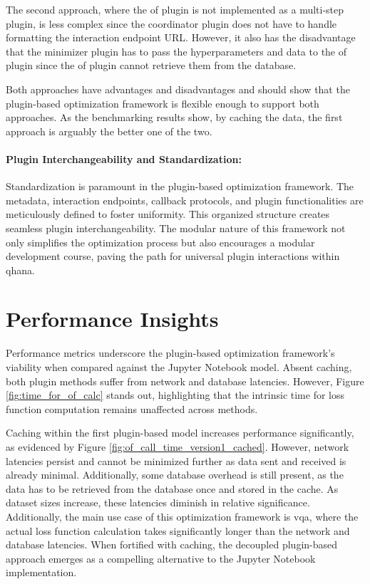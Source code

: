 \documentclass[
  a4paper,  %
  twoside,  %
  bibliography=totoc,
  headsepline,
  cleardoublepage=empty,
  parskip=half,
  draft=false
]{scrbook}
\begin{document}
The second approach, where the \gls{of} plugin is not implemented as a multi-step plugin, is less complex since the coordinator plugin does not have to handle formatting the interaction endpoint URL.
However, it also has the disadvantage that the minimizer plugin has to pass the hyperparameters and data to the \gls{of} plugin since the \gls{of} plugin cannot retrieve them from the database.

Both approaches have advantages and disadvantages and should show that the plugin-based optimization framework is flexible enough to support both approaches.
As the benchmarking results show, by caching the data, the first approach is arguably the better one of the two.


\paragraph{Plugin Interchangeability and Standardization:}
\label{sec:interchangeabilityAndStandardization}

Standardization is paramount in the plugin-based optimization framework.
The metadata, interaction endpoints, callback protocols, and plugin functionalities are meticulously defined to foster uniformity.
This organized structure creates seamless plugin interchangeability.
The modular nature of this framework not only simplifies the optimization process but also encourages a modular development course, paving the path for universal plugin interactions within \gls{qhana}.

\section{Performance Insights}
\label{sec:performanceAnalysis}

Performance metrics underscore the plugin-based optimization framework's viability when compared against the Jupyter Notebook model.
Absent caching, both plugin methods suffer from network and database latencies.
However, Figure \ref{fig:time_for_of_calc} stands out, highlighting that the intrinsic time for loss function computation remains unaffected across methods.

Caching within the first plugin-based model increases performance significantly, as evidenced by Figure \ref{fig:of_call_time_version1_cached}.
However, network latencies persist and cannot be minimized further as data sent and received is already minimal.
Additionally, some database overhead is still present, as the data has to be retrieved from the database once and stored in the cache.
As dataset sizes increase, these latencies diminish in relative significance.
Additionally, the main use case of this optimization framework is \gls{vqa}, where the actual loss function calculation takes significantly longer than the network and database latencies.
When fortified with caching, the decoupled plugin-based approach emerges as a compelling alternative to the Jupyter Notebook implementation.
\end{document}
